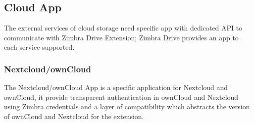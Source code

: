         \subsection{Cloud App}\label{==subsec:supportedClouds==}
        The external services of cloud storage need specific app with dedicated API to communicate with Zimbra Drive Extension;
        Zimbra Drive provides an app to each service supported.

        \subsubsection{Nextcloud/ownCloud}
        The Nextcloud/ownCloud App is a specific application for Nextcloud and ownCloud, it provide transparent authentication in
        ownCloud and Nextcloud using Zimbra credentials and a layer of compatibility which abstracts the version of
        ownCloud and Nextcloud for the extension.
